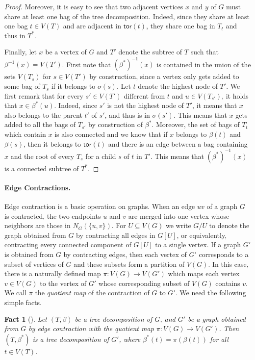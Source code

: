 \documentclass[a4paper,11pt]{article}
\numberwithin{lemma}{section}
\newtheorem{fact}[lemma]{Fact}
\newcommand{\tor}{\mathsf{tor}}
\begin{document}
\begin{proof}
 Moreover, it is easy to see that two adjacent vertices $x$ and $y$ of $G$ must share at least one bag of the tree decomposition.
 Indeed, since they share at least one bag $t \in V(T)$ and are adjacent in $\tor(t)$, they share one bag in $T_t$ and thus in $T^*$.

 Finally, let $x$ be a vertex of $G$ and $T'$ denote the subtree of $T$ such that $\beta^{-1}(x) = V(T')$.
 First note that $(\beta^*)^{-1}(x)$ is contained in the union of the sets $V(T_s)$ for $s \in V(T')$ by construction, since a vertex only gets added to some bag of $T_s$ if it belongs to $\sigma(s)$.
 Let $t$ denote the highest node of $T'$. We first remark that for every $s' \in V(T')$ different from $t$ and $u \in V(T_{s'})$, it holds that $x \in \beta^*(u)$. Indeed, since $s'$ is not the highest node of $T'$, it means that $x$ also belongs to the parent $t'$ of $s'$, and thus is in $\sigma(s')$. This means that $x$ gets added to all the bags of $T_{s'}$ by construction of $\beta^*$. Moreover, the set of bags of $T_t$ which contain $x$ is also connected and we know that if $x$ belongs to $\beta(t)$ and $\beta(s)$, then it belongs to $\tor(t)$ and there is an edge between a bag containing $x$ and the root of every $T_s$ for a child $s$ of $t$ in $T'$. This means that $(\beta^*)^{-1}(x)$ is a connected subtree of $T^*$.
\end{proof}

\paragraph{Edge Contractions.}
Edge contraction is a basic operation on graphs.
When an edge $uv$ of a graph $G$ is contracted, the two endpoints $u$ and $v$ are merged into one vertex whose neighbors are those in $N_G(\{u,v\})$.
For $U \subseteq V(G)$ we write $G/U$ to denote the graph obtained from $G$ by contracting all edges in $G[U]$, or equivalently, contracting every connected component of $G[U]$ to a single vertex.
If a graph $G'$ is obtained from $G$ by contracting edges, then each vertex of $G'$ corresponds to a subset of vertices of $G$ and these subsets form a partition of $V(G)$.
In this case, there is a naturally defined map $\pi\colon V(G) \rightarrow V(G')$ which maps each vertex $v \in V(G)$ to the vertex of $G'$ whose corresponding subset of $V(G)$ contains $v$.
We call $\pi$ the \emph{quotient map} of the contraction of $G$ to $G'$.
We need the following simple facts.

\begin{fact}[\cite{BandyapadhyayLLSX24}]\label{fact-inducedtd}
 Let $(T,\beta)$ be a tree decomposition of $G$, and $G'$ be a graph obtained from $G$ by edge contraction with the quotient map $\pi\colon V(G) \rightarrow V(G')$.
 Then $(T,\beta^*)$ is a tree decomposition of $G'$, where $\beta^*(t) = \pi(\beta(t))$ for all $t \in V(T)$.
\end{fact}
\end{document}
